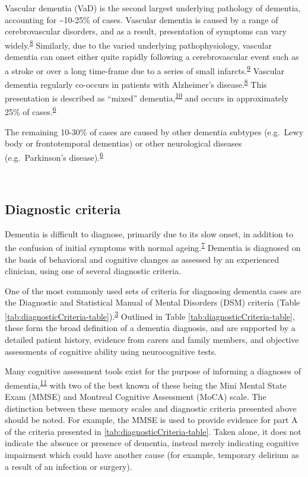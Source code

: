 \documentclass[a4paper, twoside]{templates/ociamthesis}
\begin{document}
Vascular dementia (VaD) is the second largest underlying pathology of dementia, accounting for \textasciitilde10-25\% of cases. Vascular dementia is caused by a range of cerebrovascular disorders, and as a result, presentation of symptoms can vary widely.\textsuperscript{\protect\hyperlink{ref-iadecola2013}{8}} Similarly, due to the varied underlying pathophysiology, vascular dementia can onset either quite rapidly following a cerebrovascular event such as a stroke or over a long time-frame due to a series of small infarcts.\textsuperscript{\protect\hyperlink{ref-venkat2015}{9}} Vascular dementia regularly co-occurs in patients with Alzheimer's disease.\textsuperscript{\protect\hyperlink{ref-iadecola2013}{8}} This presentation is described as ``mixed'' dementia,\textsuperscript{\protect\hyperlink{ref-custodio2017}{10}} and occurs in approximately 25\% of cases.\textsuperscript{\protect\hyperlink{ref-burns2009}{6}}

The remaining 10-30\% of cases are caused by other dementia subtypes (e.g.~Lewy body or frontotemporal dementias) or other neurological diseases (e.g.~Parkinson's disease).\textsuperscript{\protect\hyperlink{ref-burns2009}{6}}

~

\hypertarget{diagnostic-criteria}{%
\subsection{Diagnostic criteria}\label{diagnostic-criteria}}

Dementia is difficult to diagnose, primarily due to its slow onset, in addition to the confusion of initial symptoms with normal ageing.\textsuperscript{\protect\hyperlink{ref-robinson2015}{7}} Dementia is diagnosed on the basis of behavioral and cognitive changes as assessed by an experienced clinician, using one of several diagnostic criteria.

One of the most commonly used sets of criteria for diagnosing dementia cases are the Diagnostic and Statistical Manual of Mental Disorders (DSM) criteria (Table \ref{tab:diagnosticCriteria-table}).\textsuperscript{\protect\hyperlink{ref-edition2013}{3}} Outlined in Table \ref{tab:diagnosticCriteria-table}, these form the broad definition of a dementia diagnosis, and are supported by a detailed patient history, evidence from carers and family members, and objective assessments of cognitive ability using neurocognitive tests.

Many cognitive assessment tools exist for the purpose of informing a diagnoses of dementia,\textsuperscript{\protect\hyperlink{ref-sheehan2012}{11}} with two of the best known of these being the Mini Mental State Exam (MMSE) and Montreal Cognitive Assessment (MoCA) scale. The distinction between these memory scales and diagnostic criteria presented above should be noted. For example, the MMSE is used to provide evidence for part A of the criteria presented in \ref{tab:diagnosticCriteria-table}. Taken alone, it does not indicate the absence or presence of dementia, instead merely indicating cognitive impairment which could have another cause (for example, temporary delirium as a result of an infection or surgery).
\end{document}

